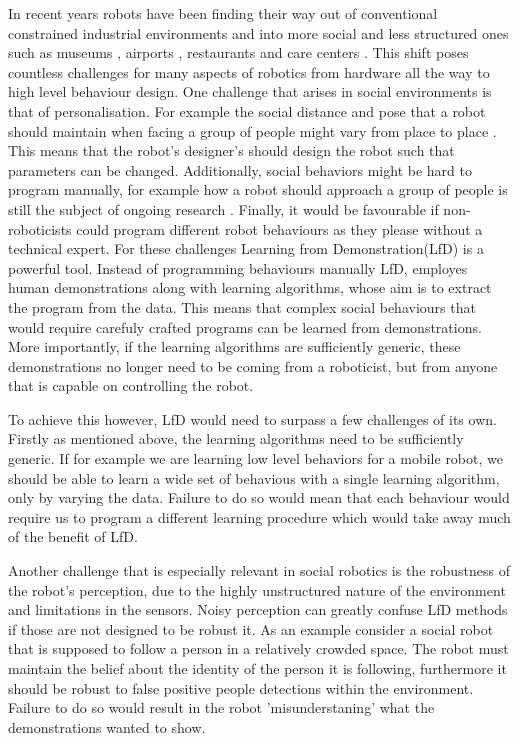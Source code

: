\documentclass[letterpaper, 10 pt, conference]{ieeeconf}
\begin{document}
In recent years robots have been finding their way out of conventional constrained industrial environments and into more social and less structured ones such as museums \cite{thrun1999minerva}, airports \cite{triebel2015spencer}, restaurants \cite{qing2010research} and care centers \cite{shiarlis2015teresa}. This shift poses countless challenges for many aspects of robotics from hardware all the way to high level behaviour design.  One challenge that arises in social environments is that of personalisation. For example the social distance and pose that a robot should maintain when facing a group of people might vary from place to place \cite{joosse2014cultural}. This means that the robot's designer's should design the robot such that parameters can be changed. Additionally, social behaviors might be hard to program manually, for example how a robot should approach a group of people is still the subject of ongoing research \cite{vroon2015dynamics}. Finally, it would be favourable if non-roboticists could program different robot behaviours as they please without a technical expert. For these challenges Learning from Demonstration(LfD) is a powerful tool. Instead of programming behaviours manually LfD, employes human demonstrations along with learning algorithms, whose aim is to extract the program from the data. This means that complex social behaviours that would require carefuly crafted programs can be learned from demonstrations. More importantly, if the learning algorithms are sufficiently generic, these demonstrations no longer need to be coming from a roboticist, but from anyone that is capable on controlling the robot. 

To achieve this however, LfD would need to surpass a few challenges of its own. Firstly as mentioned above, the learning algorithms need to be sufficiently generic. If for example we are learning low level behaviors for a mobile robot, we should be able to learn a wide set of behavious with a single learning algorithm, only by varying the data. Failure to do so would mean that each behaviour would require us to program a different learning procedure which would take away much of the benefit of LfD. 

Another challenge that is especially relevant in social robotics is the robustness of the robot's perception, due to the highly unstructured nature of the environment and limitations in the sensors. Noisy perception can greatly confuse LfD methods if those are not designed to be robust it. As an example consider a social robot that is supposed to follow a person in a relatively crowded space. The robot must maintain the belief about the identity of the person it is following, furthermore it should be robust to false positive people detections within the environment. Failure to do so would result in the robot 'misunderstaning' what the demonstrations wanted to show.
\end{document}
